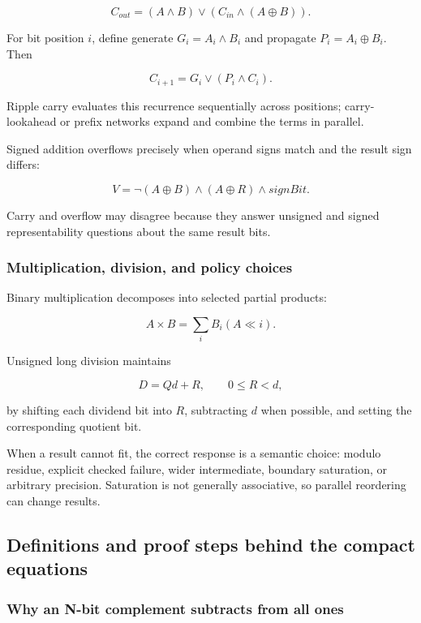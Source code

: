 \[
C_{out}=(A\land B)\lor(C_{in}\land(A\oplus B)).
\]

For bit position \(i\), define generate \(G_i=A_i\land B_i\) and propagate \(P_i=A_i\oplus B_i\). Then

\[
C_{i+1}=G_i\lor(P_i\land C_i).
\]

Ripple carry evaluates this recurrence sequentially across positions; carry-lookahead or prefix networks expand and combine the terms in parallel.

Signed addition overflows precisely when operand signs match and the result sign differs:

\[
V=\neg(A\oplus B)\land(A\oplus R)\land signBit.
\]

Carry and overflow may disagree because they answer unsigned and signed representability questions about the same result bits.

\subsubsection{Multiplication, division, and policy choices}\label{multiplication-division-and-policy-choices}

Binary multiplication decomposes into selected partial products:

\[
A\times B=\sum_i B_i(A\ll i).
\]

Unsigned long division maintains

\[
D=Qd+R,\qquad 0\le R<d,
\]

by shifting each dividend bit into \(R\), subtracting \(d\) when possible, and setting the corresponding quotient bit.

When a result cannot fit, the correct response is a semantic choice: modulo residue, explicit checked failure, wider intermediate, boundary saturation, or arbitrary precision. Saturation is not generally associative, so parallel reordering can change results.

\subsection{Definitions and proof steps behind the compact equations}\label{definitions-and-proof-steps-behind-the-compact-equations}

\subsubsection{Why an N-bit complement subtracts from all ones}\label{why-an-n-bit-complement-subtracts-from-all-ones}

